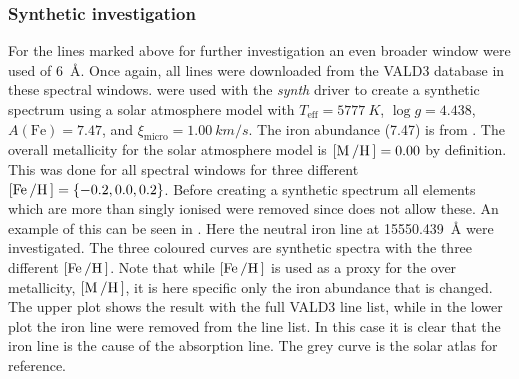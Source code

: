 \subsubsection{Synthetic investigation}

For the lines marked above for further investigation an even broader window were used of
\SI{6}{\angstrom}. Once again, all lines were downloaded from the VALD3 database in these spectral
windows. \MOOG were used with the \emph{synth} driver to create a synthetic spectrum using a solar
atmosphere model with $T_\mathrm{eff}=\SI{5777}{K}$, $\log g=4.438$, $A(\mathrm{Fe})=7.47$, and
$\xi_\mathrm{micro}=\SI{1.00}{km/s}$. The iron abundance (7.47) is from \citet{Gonzalez2000}. The
overall metallicity for the solar atmosphere model is $[\ion{M}/\ion{H}]=0.00$ by definition. This
was done for all spectral windows for three different $[\ion{Fe}/\ion{H}]=\{-0.2, 0.0, 0.2\}$.
Before creating a synthetic spectrum all elements which are more than singly ionised were removed
since \MOOG does not allow these. An example of this can be seen in
. Here the neutral iron line at \SI{15550.439}{\angstrom} were
investigated. The three coloured curves are synthetic spectra with the three different
$[\ion{Fe}/\ion{H}]$. Note that while $[\ion{Fe}/\ion{H}]$ is used as a proxy for the over
metallicity, $[\ion{M}/\ion{H}]$, it is here specific only the iron abundance that is changed. The
upper plot shows the result with the full VALD3 line list, while in the lower plot the iron line
were removed from the line list. In this case it is clear that the iron line is the cause of the
absorption line. The grey curve is the solar atlas for reference.

